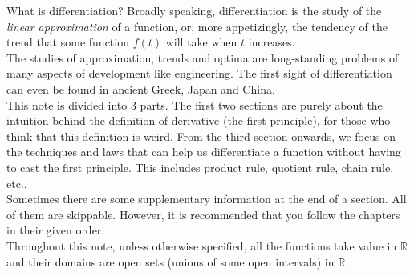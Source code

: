 What is differentiation?
Broadly speaking, differentiation is the study of the \textit{linear approximation} of a function, or, more appetizingly, the tendency of the trend that some function $f(t)$ will take when $t$ increases.\\
The studies of approximation, trends and optima are long-standing problems of many aspects of development like engineering.
The first sight of differentiation can even be found in ancient Greek, Japan and China.\\
This note is divided into 3 parts.
The first two sections are purely about the intuition behind the definition of derivative (the first principle), for those who think that this definition is weird.
From the third section onwards, we focus on the techniques and laws that can help us differentiate a function without having to cast the first principle.
This includes product rule, quotient rule, chain rule, etc..\\
Sometimes there are some supplementary information at the end of a section.
All of them are skippable.
However, it is recommended that you follow the chapters in their given order.\\
Throughout this note, unless otherwise specified, all the functions take value in $\mathbb R$ and their domains are open sets (unions of some open intervals) in $\mathbb R$.